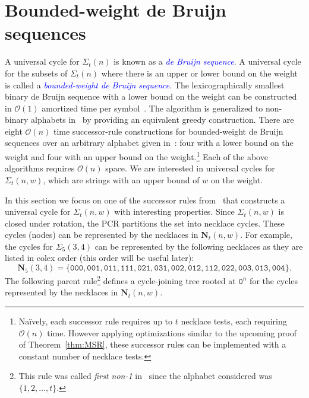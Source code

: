 \documentclass[US-letter,USenglish,authorcolumns,autoref]{lipics-v2021}
\renewcommand{\tt} {\mathtt}
\newcommand{\bN}{\mathbf{N}}
\newcommand{\defo}[1] {\emph{\textcolor{blue}{#1}}}
\begin{document}
\section{Bounded-weight de Bruijn sequences} \label{sec:bound}

A universal cycle for $\Sigma_t(n)$ is known as a \defo{de Bruijn sequence}.  A universal cycle for the subsets of $\Sigma_t(n)$ where there is an upper or lower bound on the weight is called a \defo{bounded-weight de Bruijn sequence}.  The lexicographically smallest binary de Bruijn sequence with a lower bound on the weight can be constructed in $\mathcal{O}(1)$ amortized time per symbol~\cite{weight1}.  The algorithm is generalized to non-binary alphabets in~\cite{generalize-classic-greedy} by providing an equivalent greedy construction.  
There are eight $\mathcal{O}(n)$ time successor-rule constructions for bounded-weight de Bruijn sequences over an arbitrary alphabet given in~\cite{karyframework}: four with a lower bound on the weight and four with an upper bound on the weight.\footnote{Na\"{i}vely, each successor rule requires up to $t$ necklace tests, each requiring $\mathcal{O}(n)$ time.  However applying optimizations similar to the upcoming proof of Theorem~\ref{thm:MSR}, these successor rules can be implemented with a constant number of necklace tests.} 
Each of the above algorithms requires $\mathcal{O}(n)$ space. 
We are interested in universal cycles for $\Sigma_t(n,w)$, which are strings with an upper bound of $w$ on the weight.

In this section we focus on one of the successor rules from~\cite{karyframework} that constructs a universal cycle for $\Sigma_t(n,w)$ with interesting properties. 
%
Since $\Sigma_t(n,w)$ is closed under rotation, the PCR partitions the set into necklace cycles. These cycles (nodes) can be represented by the necklaces in $\bN_t(n,w)$.  
For example, the cycles for $\Sigma_5(3,4)$ can be represented by the following necklaces as they are listed in colex order (this order will be useful later):
%
 \[   \bN_5(3,4) =  \{ \tt{000, 001, 011, 111, 021, 031, 002, 012, 112, 022, 003, 013, 004} \}. \]
%
The following parent rule\footnote{This rule was called \emph{first non-1} in~\cite{karyframework} since the alphabet considered was $\{1,2, \ldots ,t\}$.} defines a cycle-joining tree rooted at $\tt{0}^n$ for the  cycles represented by the necklaces in $\bN_t(n,w)$. 
\end{document}
